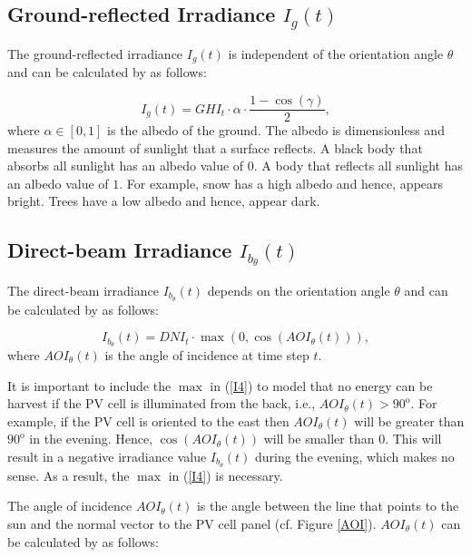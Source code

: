 \subsection{Ground-reflected Irradiance \texorpdfstring{$I_g(t)$}{I\_g(t)}}\label{ground_reflected_component}

The ground-reflected irradiance $I_{g}(t)$ is independent of the orientation angle $\theta$ and can be calculated by \cite{Solar_Cell_albedo_plus_ground_reflected_irradiance} as follows:


\begin{equation}\label{I3}
I_{g}(t)= GHI_t \cdot \alpha \cdot \frac{1-\cos(\gamma)}{2},
\end{equation}
where $\alpha\in[0,1]$ is the albedo of the ground. The albedo is dimensionless and measures the amount of sunlight that a surface reflects. A black body that absorbs all sunlight has an albedo value of $0$. A body that reflects all sunlight has an albedo value of $1$. For example, snow has a high albedo and hence, appears bright. Trees have a low albedo and hence, appear dark.



\subsection{Direct-beam Irradiance \texorpdfstring{$I_{b_\theta}(t)$}{I\_{b\_{\{theta\}}}(t)}}\label{direct_beam_component}
The direct-beam irradiance $I_{b_\theta}(t)$ depends on the orientation angle $\theta$ and can be calculated by \cite{Solar_Cell_3irradiance} as follows:


\begin{equation}\label{I4}
I_{b_\theta}(t)=DNI_t \cdot  \max(0,\cos(AOI_{\theta}(t))),
\end{equation}
where $AOI_{\theta}(t)$ is the angle of incidence at time step $t$.

It is important to include the $\max$ in (\ref{I4}) to model that no energy can be harvest if the PV cell is illuminated from the back, i.e., $AOI_{\theta}(t)>90^\mathrm{o}$. For example, if the PV cell is oriented to the east then $AOI_{\theta}(t)$ will be greater than $90^\mathrm{o}$ in the evening. Hence, $\cos(AOI_{\theta}(t))$ will be smaller than $0$. This will result in a negative irradiance value $I_{b_\theta}(t)$ during the evening, which makes no sense. As a result, the $\max$ in (\ref{I4}) is necessary.

The angle of incidence $AOI_{\theta}(t)$ is the angle between the line that points to the sun and the normal vector to the PV cell panel (cf. Figure \ref{AOI}). $AOI_{\theta}(t)$ can be calculated by \cite{Solar_Cell_declination_inclination_angle} as follows:

